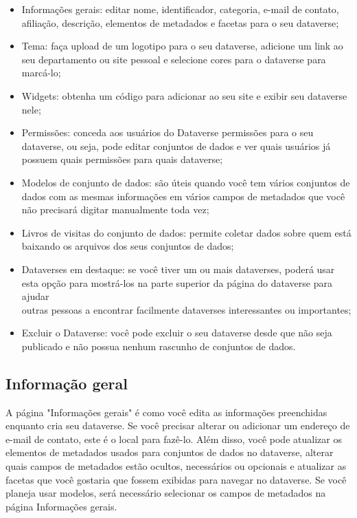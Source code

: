 \documentclass[12pt,hidelinks]{article}
\begin{document}
\begin{itemize}

    \item Informações gerais: editar nome, identificador, categoria, e-mail de contato, afiliação, descrição, elementos de metadados e facetas para o seu dataverse;
    \item Tema: faça upload de um logotipo para o seu dataverse, adicione um link ao seu departamento ou site pessoal e selecione cores para o dataverse para marcá-lo;
    \item Widgets: obtenha um código para adicionar ao seu site e exibir seu dataverse nele;
    \item Permissões: conceda aos usuários do Dataverse permissões para o seu dataverse, ou seja, pode editar conjuntos de dados e ver quais usuários já possuem quais permissões para quais dataverse;
    \item Modelos de conjunto de dados: são úteis quando você tem vários conjuntos de dados com as mesmas informações em vários campos de metadados que você não precisará digitar manualmente toda vez;
    \item Livros de visitas do conjunto de dados: permite coletar dados sobre quem está baixando os arquivos dos seus conjuntos de dados;
    \item Dataverses em destaque: se você tiver um ou mais dataverses, poderá usar esta opção para mostrá-los na parte superior da página do dataverse para ajudar \\outras pessoas a encontrar facilmente dataverses interessantes ou importantes;
    \item Excluir o Dataverse: você pode excluir o seu dataverse desde que não seja publicado e não possua nenhum rascunho de conjuntos de dados.
    
\end{itemize}

    \subsection{Informação geral}
    
\qquad A página "Informações gerais" é como você edita as informações preenchidas enquanto cria seu dataverse. Se você precisar alterar ou adicionar um endereço de e-mail de contato, este é o local para fazê-lo. Além disso, você pode atualizar os elementos de metadados usados para conjuntos de dados no dataverse, alterar quais campos de metadados estão ocultos, necessários ou opcionais e atualizar as facetas que você gostaria que fossem exibidas para navegar no dataverse. Se você planeja usar modelos, será necessário selecionar os campos de metadados na página Informações gerais.
\end{document}
